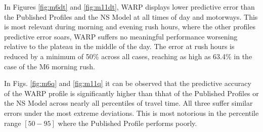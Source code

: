 \documentclass[a4paper, 10pt, conference]{ieeeconf}      %
\begin{document}
In Figures \ref{fig:m6dt} and \ref{fig:m11dt}, WARP displays lower predictive error than the Published Profiles and the NS Model at all times of day and motorways. 
This is most relevant during morning and evening rush hours, where the other profiles predictive error soars, WARP suffers no meaningful performance worsening relative to the plateau in the middle of the day.
The error at rush hours is reduced by a minimum of 50\% across all cases, reaching as high as 63.4\% in the case of the M6 morning rush.

In Figs. \ref{fig:m6q} and \ref{fig:m11q} it can be observed that the predictive accuracy of the WARP profile is significantly higher than thhat of the Published Profiles or the NS Model across nearly all percentiles of travel time. All three suffer similar errors under the most extreme deviations.
This is most notorious in the percentile range $[50-95]$ where the Published Profile performs poorly.
\end{document}
